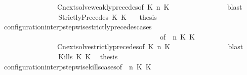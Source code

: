 \begin{isabellebody}
\ \ \ \ \ \ \ \ \ \ \ \ \ \ \ \ Cnext{\isacharunderscore}solve{\isacharunderscore}weakly{\isacharunderscore}precedes{\isacharbrackleft}of\ {\isacartoucheopen}K{}{\isacartoucheclose}\ {\isacartoucheopen}n{\isacartoucheclose}\ {\isacartoucheopen}K{}{\isacartoucheclose}\ {\isacartoucheopen}{\isasymGamma}{\isacartoucheclose}\ {\isacartoucheopen}{\isasymPsi}{\isacartoucheclose}\ \ {\isacartoucheopen}{\isasymPhi}{\isacartoucheclose}{\isacharbrackright}\isanewline
\ \ \ \ \ \ \ \ \ \ \isamarkupfalse%
\ blast\isanewline
\ \ \ \ \ \ \isamarkupfalse%
\isanewline
\ \ \ \ \ \ \ \ \isamarkupfalse%
\ {\isacharparenleft}StrictlyPrecedes\ K{}\ K{}{\isacharparenright}\ \ \isamarkupfalse%
\ {\isacharquery}thesis\isanewline
\ \ \ \ \ \ \ \ \ \ \isamarkupfalse%
\ configuration{\isacharunderscore}interp{\isacharunderscore}stepwise{\isacharunderscore}strictly{\isacharunderscore}precedes{\isacharunderscore}cases\isanewline
\ \ \ \ \ \ \ \ \ \ \ \ \ \ \ \ \ \ \ \ \ \ \ \ \ \ \ \ \ \ \ \ \ \ \ \ \ \ \ \ \ \ \ \ \ {\isacharbrackleft}of\ {\isacartoucheopen}{\isasymGamma}{\isacartoucheclose}\ {\isacartoucheopen}n{\isacartoucheclose}\ {\isacartoucheopen}K{}{\isacartoucheclose}\ {\isacartoucheopen}K{}{\isacartoucheclose}\ {\isacartoucheopen}{\isasymPsi}{\isacartoucheclose}\ {\isacartoucheopen}{\isasymPhi}{\isacartoucheclose}{\isacharbrackright}\isanewline
\ \ \ \ \ \ \ \ \ \ \ \ \ \ \ \ Cnext{\isacharunderscore}solve{\isacharunderscore}strictly{\isacharunderscore}precedes{\isacharbrackleft}of\ {\isacartoucheopen}K{}{\isacartoucheclose}\ {\isacartoucheopen}n{\isacartoucheclose}\ {\isacartoucheopen}K{}{\isacartoucheclose}\ {\isacartoucheopen}{\isasymGamma}{\isacartoucheclose}\ {\isacartoucheopen}{\isasymPsi}{\isacartoucheclose}\ \ {\isacartoucheopen}{\isasymPhi}{\isacartoucheclose}{\isacharbrackright}\isanewline
\ \ \ \ \ \ \ \ \ \ \isamarkupfalse%
\ blast\isanewline
\ \ \ \ \ \ \isamarkupfalse%
\isanewline
\ \ \ \ \ \ \ \ \isamarkupfalse%
\ {\isacharparenleft}Kills\ K{}\ K{}{\isacharparenright}\ \isamarkupfalse%
\ {\isacharquery}thesis\isanewline
\ \ \ \ \ \ \ \ \ \ \isamarkupfalse%
\ configuration{\isacharunderscore}interp{\isacharunderscore}stepwise{\isacharunderscore}kills{\isacharunderscore}cases{\isacharbrackleft}of\ {\isacartoucheopen}{\isasymGamma}{\isacartoucheclose}\ {\isacartoucheopen}n{\isacartoucheclose}\ {\isacartoucheopen}K{}{\isacartoucheclose}\ {\isacartoucheopen}K{}{\isacartoucheclose}\ {\isacartoucheopen}{\isasymPsi}{\isacartoucheclose}\ {\isacartoucheopen}{\isasymPhi}{\isacartoucheclose}{\isacharbrackright}\isanewline

\end{isabellebody}
